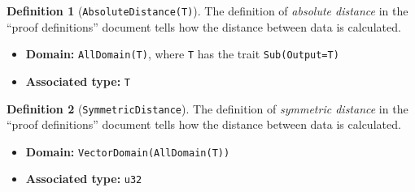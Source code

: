 \documentclass[11pt,a4paper]{article}
\theoremstyle{definition}
\newtheorem{definition}{Definition}[section]
\newcommand{\metricDefn}[1]{The definition of \emph{#1} in the ``proof definitions'' document tells how the distance between data is calculated.}
\begin{document}
\begin{definition}[\texttt{AbsoluteDistance(T)}]
\metricDefn{absolute distance}
\begin{itemize}
    \item \textbf{Domain:} \texttt{AllDomain(T)}, where \texttt{T} has the trait \texttt{Sub(Output=T)}
    \item \textbf{Associated type:} \texttt{T}
\end{itemize}
\end{definition}

\begin{definition}[\texttt{SymmetricDistance}]
\metricDefn{symmetric distance}
\begin{itemize}
    \item \textbf{Domain:} \texttt{VectorDomain(AllDomain(T))}
    \item \textbf{Associated type:} \texttt{u32}
\end{itemize}
\end{definition}
\end{document}
